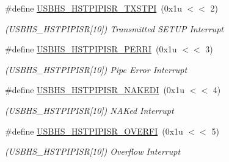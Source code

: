 \begin{DoxyCompactItemize}
\mbox{\label{group__SAMV71__USBHS_ga5b657f7ffb9144716c472b4873838612}} 
\#define \mbox{\hyperlink{group__SAMV71__USBHS_ga5b657f7ffb9144716c472b4873838612}{U\+S\+B\+H\+S\+\_\+\+H\+S\+T\+P\+I\+P\+I\+S\+R\+\_\+\+T\+X\+S\+T\+PI}}~(0x1u $<$$<$ 2)
\begin{DoxyCompactList}\small\item\em (U\+S\+B\+H\+S\+\_\+\+H\+S\+T\+P\+I\+P\+I\+SR\mbox{[}10\mbox{]}) Transmitted S\+E\+T\+UP Interrupt \end{DoxyCompactList}\item 
\mbox{\label{group__SAMV71__USBHS_ga73998e12ffdfca1ab0bc9cf53797332c}} 
\#define \mbox{\hyperlink{group__SAMV71__USBHS_ga73998e12ffdfca1ab0bc9cf53797332c}{U\+S\+B\+H\+S\+\_\+\+H\+S\+T\+P\+I\+P\+I\+S\+R\+\_\+\+P\+E\+R\+RI}}~(0x1u $<$$<$ 3)
\begin{DoxyCompactList}\small\item\em (U\+S\+B\+H\+S\+\_\+\+H\+S\+T\+P\+I\+P\+I\+SR\mbox{[}10\mbox{]}) Pipe Error Interrupt \end{DoxyCompactList}\item 
\mbox{\label{group__SAMV71__USBHS_gafefe427d47e2f528a7608c5313e2e9a7}} 
\#define \mbox{\hyperlink{group__SAMV71__USBHS_gafefe427d47e2f528a7608c5313e2e9a7}{U\+S\+B\+H\+S\+\_\+\+H\+S\+T\+P\+I\+P\+I\+S\+R\+\_\+\+N\+A\+K\+E\+DI}}~(0x1u $<$$<$ 4)
\begin{DoxyCompactList}\small\item\em (U\+S\+B\+H\+S\+\_\+\+H\+S\+T\+P\+I\+P\+I\+SR\mbox{[}10\mbox{]}) N\+A\+Ked Interrupt \end{DoxyCompactList}\item 
\mbox{\label{group__SAMV71__USBHS_ga557f28502fc74053e78b6ee0144e37e4}} 
\#define \mbox{\hyperlink{group__SAMV71__USBHS_ga557f28502fc74053e78b6ee0144e37e4}{U\+S\+B\+H\+S\+\_\+\+H\+S\+T\+P\+I\+P\+I\+S\+R\+\_\+\+O\+V\+E\+R\+FI}}~(0x1u $<$$<$ 5)
\begin{DoxyCompactList}\small\item\em (U\+S\+B\+H\+S\+\_\+\+H\+S\+T\+P\+I\+P\+I\+SR\mbox{[}10\mbox{]}) Overflow Interrupt \end{DoxyCompactList}\item 
\mbox{\label{group__SAMV71__USBHS_ga49bab8fafde4c709dd7decb1c97b0503}} 

\end{DoxyCompactItemize}

